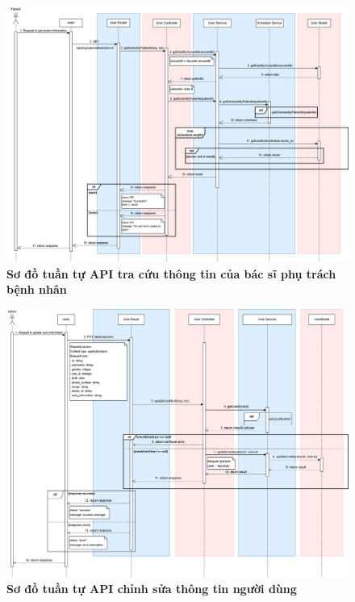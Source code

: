 \begin{figure}[H]
	\centering
	\includegraphics[width=16cm]{Images/api_sequence/user/getDoctorByPatientId.drawio.png}
	\caption[Sơ đồ tuần tự API tra cứu thông tin của bác sĩ phụ trách bệnh nhân]{\bfseries \fontsize{12pt}{0pt}\selectfont Sơ đồ tuần tự API tra cứu thông tin của bác sĩ phụ trách bệnh nhân}
	\label{sequence_diagram_get_doctor_data}
\end{figure}

\begin{figure}[H]
	\centering
	\includegraphics[width=16cm]{Images/api_sequence/user/updateUserById.drawio.png}
	\caption[Sơ đồ tuần tự API chỉnh sửa thông tin người dùng]{\bfseries \fontsize{12pt}{0pt}\selectfont Sơ đồ tuần tự API chỉnh sửa thông tin người dùng}
	\label{sequence_diagram_update_user}
\end{figure}

